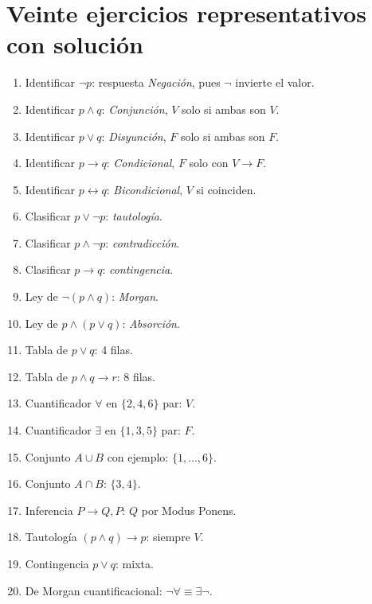 \documentclass[11pt,a4paper,openany]{book}
\begin{document}
\chapter{Veinte ejercicios representativos con soluci\'on}
\label{ch:ej20}
\begin{enumerate}[leftmargin=*]
\item Identificar $\lnot p$: respuesta \textit{Negaci\'on}, pues $\lnot$ invierte el valor.
\item Identificar $p \land q$: \textit{Conjunci\'on}, $V$ solo si ambas son $V$.
\item Identificar $p \lor q$: \textit{Disyunci\'on}, $F$ solo si ambas son $F$.
\item Identificar $p \to q$: \textit{Condicional}, $F$ solo con $V \to F$.
\item Identificar $p \leftrightarrow q$: \textit{Bicondicional}, $V$ si coinciden.
\item Clasificar $p \lor \lnot p$: \textit{tautolog\'ia}.
\item Clasificar $p \land \lnot p$: \textit{contradicci\'on}.
\item Clasificar $p \to q$: \textit{contingencia}.
\item Ley de $\lnot(p \land q)$: \textit{Morgan}.
\item Ley de $p \land (p \lor q)$: \textit{Absorci\'on}.
\item Tabla de $p \lor q$: 4 filas.
\item Tabla de $p \land q \to r$: 8 filas.
\item Cuantificador $\forall$ en $\{2,4,6\}$ par: $V$.
\item Cuantificador $\exists$ en $\{1,3,5\}$ par: $F$.
\item Conjunto $A \cup B$ con ejemplo: $\{1,\ldots,6\}$.
\item Conjunto $A \cap B$: $\{3,4\}$.
\item Inferencia $P \to Q, P$: $Q$ por Modus Ponens.
\item Tautolog\'ia $(p \land q) \to p$: siempre $V$.
\item Contingencia $p \lor q$: mixta.
\item De Morgan cuantificacional: $\lnot\forall \equiv \exists\lnot$.
\end{enumerate}
\end{document}
